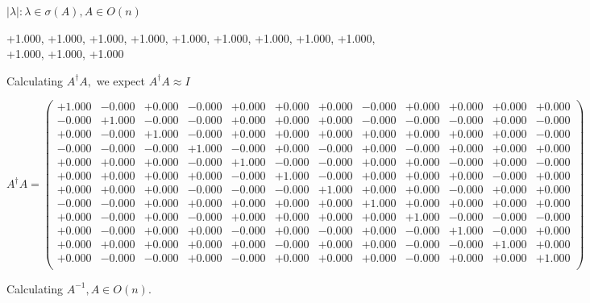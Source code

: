 \documentclass[9pt]{article}
\theoremstyle{plain}
\theoremstyle{definition}
\theoremstyle{remark}
\numberwithin{equation}{section}
\begin{document}
 $|\lambda | : \lambda \in \sigma(A) , A \in O(n)$

+1.000, +1.000, +1.000, +1.000, +1.000, +1.000, +1.000, +1.000, +1.000, +1.000, +1.000, +1.000


Calculating $A^{\dag} A,$  we expect $A^{\dag} A \approx I$

$A^{\dag} A = \left(
\begin{array}{
cccccccccccc}
+1.000 & -0.000 & +0.000 & -0.000 & +0.000 & +0.000 & +0.000 & -0.000 & +0.000 & +0.000 & +0.000 & +0.000 \\
-0.000 & +1.000 & -0.000 & -0.000 & +0.000 & +0.000 & +0.000 & -0.000 & -0.000 & -0.000 & +0.000 & -0.000 \\
+0.000 & -0.000 & +1.000 & -0.000 & +0.000 & +0.000 & +0.000 & +0.000 & +0.000 & +0.000 & +0.000 & -0.000 \\
-0.000 & -0.000 & -0.000 & +1.000 & -0.000 & +0.000 & -0.000 & +0.000 & -0.000 & +0.000 & +0.000 & +0.000 \\
+0.000 & +0.000 & +0.000 & -0.000 & +1.000 & -0.000 & -0.000 & +0.000 & +0.000 & -0.000 & +0.000 & -0.000 \\
+0.000 & +0.000 & +0.000 & +0.000 & -0.000 & +1.000 & -0.000 & +0.000 & +0.000 & +0.000 & -0.000 & +0.000 \\
+0.000 & +0.000 & +0.000 & -0.000 & -0.000 & -0.000 & +1.000 & +0.000 & +0.000 & -0.000 & +0.000 & +0.000 \\
-0.000 & -0.000 & +0.000 & +0.000 & +0.000 & +0.000 & +0.000 & +1.000 & +0.000 & +0.000 & +0.000 & +0.000 \\
+0.000 & -0.000 & +0.000 & -0.000 & +0.000 & +0.000 & +0.000 & +0.000 & +1.000 & -0.000 & -0.000 & -0.000 \\
+0.000 & -0.000 & +0.000 & +0.000 & -0.000 & +0.000 & -0.000 & +0.000 & -0.000 & +1.000 & -0.000 & +0.000 \\
+0.000 & +0.000 & +0.000 & +0.000 & +0.000 & -0.000 & +0.000 & +0.000 & -0.000 & -0.000 & +1.000 & +0.000 \\
+0.000 & -0.000 & -0.000 & +0.000 & -0.000 & +0.000 & +0.000 & +0.000 & -0.000 & +0.000 & +0.000 & +1.000 \\
\end{array}
\right)$ \newline 

Calculating $A^{-1} ,  A \in O(n)$.
\end{document}
